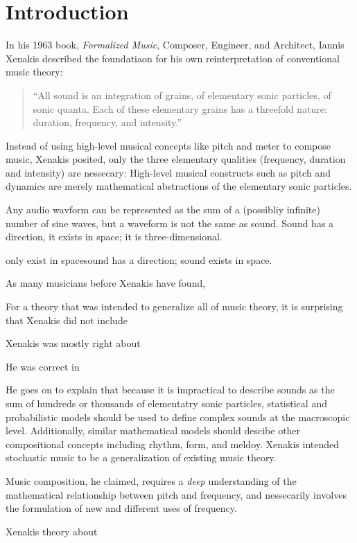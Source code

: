 \cleardoublepage
\chapter{Introduction}
\label{ch:introduction}
In his 1963 book, \textit{Formalized Music}, Composer, Engineer, and
Architect, Iannis Xenakis described the foundatiaon for his own
reinterpretation of conventional music theory: 
\begin{quotation}
  ``All sound is an integration of grains, of elementary sonic
  particles, of sonic quanta. Each of these elementary grains has a
  threefold nature: duration, frequency, and intensity.''
\end{quotation}
Instead of using high-level musical concepts like pitch and meter to
compose music, Xenakis posited, only the three elementary qualities
(frequency, duration and intensity) are nessecary: High-level musical
constructs such as pitch and dynamics are merely mathematical
abstractions of the elementary sonic particles. 



Any audio wavform can be represented as the sum of a (possibliy infinite)
number of sine waves, but a waveform is not the same as sound. Sound
has a direction, it exists in space; it is three-dimensional.

only exist in spacesound has a direction; sound exists in space. 


As many
musicians before Xenakis have found,


For a theory that was intended to generalize all
of music theory, it is surprising that Xenakis did not include 


 Xenakis was mostly right about

He was correct in 


He goes on to
explain that because it is impractical to describe sounds as the sum
of hundreds or thousands of elementatry sonic particles, statistical
and probabilistic models should be used to define complex sounds at
the macroscopic level. Additionally, similar mathematical models
should descibe other compositional concepts including rhythm, form,
and meldoy. Xenakis intended stochastic music to be a generalization
of existing music theory.

 Music composition, he
claimed, requires a \emph{deep} understanding of the mathematical
relationship between pitch and frequency, and nessecarily involves the
formulation of new and different uses of frequency.

Xenakis theory about 



